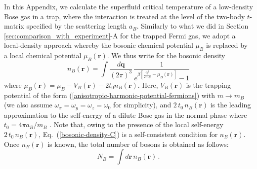 \documentclass[pra,twocolumn,aps,amssymb,showpacs,superscriptaddress]{revtex4-1}
\begin{document}
In this Appendix, we calculate the superfluid critical temperature of a low-density Bose gas in a trap, where the interaction is treated at the level of the two-body $t$-matrix specified by the scattering length $a_{B}$.
Similarly to what we did in Section \ref{sec:comparison_with_experiment}-A for the trapped Fermi gas, we adopt a local-density approach whereby the bosonic chemical potential $\mu_{B}$ is replaced by a 
local chemical potential $\mu_{B}(\mathbf{r})$.
We thus write for the bosonic density
\begin{equation}
n_{B}(\mathbf{r}) = \int \! \frac{d\mathbf{q}}{(2 \pi)^{3}} \, \frac{1}{e^{\beta \left[\frac{\mathbf{q}^{2}}{2m_{B}} - \mu_{B}(\mathbf{r}) \right]} - 1}
\label{bosonic-density-C}
\end{equation} 
where $\mu_{B}(\mathbf{r}) = \mu_{B} - V_{B}(\mathbf{r}) - 2 t_{0}n_{B}(\mathbf{r})$.
Here, $V_{B}(\mathbf{r})$ is the trapping potential of the form (\ref{anisotropic-harmonic-potential-fermions}) with $m \rightarrow m_{B}$ (we also assume 
$\omega_{x}=\omega_{y}=\omega_{z}=\omega_{0}$ for simplicity), and $2 \, t_{0} \, n_{B}(\mathbf{r})$ is the leading approximation to the
self-energy of a dilute Bose gas in the normal phase where $t_{0} = 4 \pi a_{B} / m_{B}$ \cite{Popov-1987}.
Note that, owing to the presence of the local self-energy $2 \, t_{0} \, n_{B}(\mathbf{r})$, Eq.~(\ref{bosonic-density-C}) is a self-consistent condition for $n_{B}(\mathbf{r})$.
Once $n_{B}(\mathbf{r})$ is known, the total number of bosons is obtained as follows:
\begin{equation}
N_{B} = \int \! d\mathbf{r} \, n_{B}(\mathbf{r}) \, .
\label{total-number-boson-C}
\end{equation}
\end{document}
